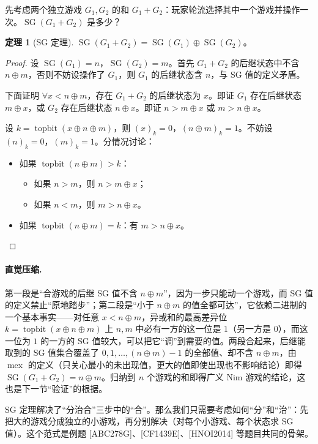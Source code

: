 \documentclass[UTF8,a4paper,11pt,oneside,openany,fontset=fandol]{ctexbook}
\theoremstyle{definition}
\newtheorem{theorem}[definition]{定理}
\newcommand{\mex}{\operatorname{mex}}
\newcommand{\SG}{\operatorname{SG}}
\newcommand{\topbit}{\operatorname{topbit}}
\begin{document}
先考虑两个独立游戏 $G_1,G_2$ 的和 $G_1+G_2$：玩家轮流选择其中一个游戏并操作一次。$\SG(G_1+G_2)$ 是多少？

\begin{theorem}[SG 定理]\label{thm:sgtheorem}
$\SG(G_1+G_2)=\SG(G_1)\oplus\SG(G_2)$。
\end{theorem}
\begin{proof}
设 $\SG(G_1)=n$，$\SG(G_2)=m$。首先 $G_1+G_2$ 的后继状态中不含 $n\oplus m$，否则不妨设操作了 $G_1$，则 $G_1$ 的后继状态含 $n$，与 SG 值的定义矛盾。

下面证明 $\forall x<n\oplus m$，存在 $G_1+G_2$ 的后继状态为 $x$。即证 $G_1$ 存在后继状态 $m\oplus x$，或 $G_2$ 存在后继状态 $n\oplus x$。即证 $n>m\oplus x$ 或 $m>n\oplus x$。

设 $k=\topbit(x\oplus n\oplus m)$，则 $(x)_k=0$，$(n\oplus m)_k=1$。不妨设 $(n)_k=0$，$(m)_k=1$。分情况讨论：
\begin{itemize}
\item 如果 $\topbit(n\oplus m)>k$：
\begin{itemize}
\item 如果 $n>m$，则 $n>m\oplus x$；
\item 如果 $n<m$，则 $m>n\oplus x$。
\end{itemize}
\item 如果 $\topbit(n\oplus m)=k$：有 $m>n\oplus x$。
\end{itemize}
\end{proof}

\paragraph{直觉压缩.} 第一段是“合游戏的后继 SG 值不含 $n\oplus m$”，因为一步只能动一个游戏，而 SG 值的定义禁止“原地踏步”；第二段是“小于 $n\oplus m$ 的值全都可达”，它依赖二进制的一个基本事实——对任意 $x<n\oplus m$，异或和的最高差异位 $k=\topbit(x\oplus n\oplus m)$ 上 $n,m$ 中必有一方的这一位是 $1$（另一方是 $0$），而这一位为 $1$ 的一方的 SG 值较大，可以把它“调”到需要的值。两段合起来，后继能取到的 SG 值集合覆盖了 $0,1,\ldots,(n\oplus m)-1$ 的全部值、却不含 $n\oplus m$，由 $\mex$ 的定义（只关心最小的未出现值，更大的值即使出现也不影响结论）即得 $\SG(G_1+G_2)=n\oplus m$。归纳到 $n$ 个游戏的和即得广义 Nim 游戏的结论，这也是下一节“验证”的根据。

SG 定理解决了“分治合”三步中的“合”。那么我们只需要考虑如何“分”和“治”：先把大的游戏分成独立的小游戏，再分别解决（对每个小游戏、每个状态求 SG 值）。这个范式是例题 [ABC278G]、[CF1439E]、[HNOI2014] 等题目共同的骨架。
\end{document}
